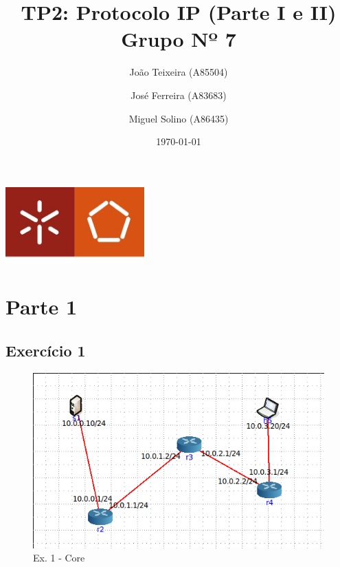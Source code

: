 \documentclass[a4paper]{report}
\begin{document}
\title{TP2:  Protocolo IP (Parte I e II)\\ 
\large Grupo Nº 7}
\author{João Teixeira (A85504) \and José Ferreira (A83683) \and Miguel Solino (A86435)}

\date{\today}

\begin{center}
    \begin{minipage}{0.75\linewidth}
        \centering
        \includegraphics[width=0.4\textwidth]{images/eng.jpeg}\par\vspace{1cm}
        \vspace{1cm}
        \href{https://www.uminho.pt/PT}
        {\color{black}{\scshape\LARGE Universidade do Minho}} \par
        \vspace{1cm}
        \href{https://www.di.uminho.pt/}
        {\color{black}{\scshape\Large Departamento de Informática}} \par
        \maketitle
    \end{minipage}
\end{center}

\tableofcontents

\pagebreak
\chapter{Parte 1}
\section{Exercício 1}

\begin{figure}[H]
    \centering 
    \includegraphics[width=\textwidth]{images/coreEx1.png}  
    \caption{Ex. 1 - Core}
    \label{fig:coreEx1}
\end{figure}
\end{document}
